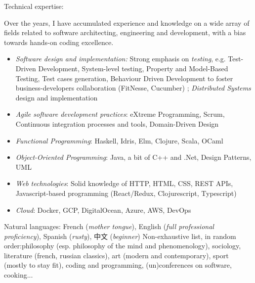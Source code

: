 \documentclass[12pt,a4paper]{article}
\begin{document}




\inlineheadsection
    {Technical expertise:}
    {Over the years, I have accumulated experience and knowledge on a wide array of fields related to software architecting, engineering and development, with a bias towards hands-on coding excellence.
      \begin{itemize}
      \item \emph{Software design and implementation:} Strong emphasis on \emph{testing}, e.g. Test-Driven Development, System-level testing, Property and Model-Based Testing, Test cases generation, Behaviour Driven Development to foster business-developers collaboration (FitNesse, Cucumber) ; \emph{Distributed Systems} design and implementation
      \item \emph{Agile software development practices}: eXtreme Programming, Scrum, Continuous integration processes and tools, Domain-Driven Design
      \item \emph{Functional Programming}: Haskell, Idris, Elm, Clojure, Scala, OCaml
      \item \emph{Object-Oriented Programming}: Java, a bit of C++ and .Net, Design Patterns, UML
      \item \emph{Web technologies}: Solid knowledge of HTTP, HTML, CSS, REST APIs, Javascript-based programming (React/Redux, Clojurescript, Typescript)
      \item \emph{Cloud}: Docker, GCP, DigitalOcean, Azure, AWS, DevOps
      \end{itemize}
    }
    \inlineheadsection
        {Natural languages:}
        {French (\emph{mother tongue}), English (\emph{full professional proficiency}), Spanish (\emph{rusty}), 中文 (\emph{beginner})}
\inlineheadsection
    {Non-exhaustive list, in random order:}{philosophy (esp. philosophy of the mind and phenomenology), sociology, literature (french, russian classics), art (modern and contemporary), sport (mostly to stay fit), coding and programming, (un)conferences on software, cooking...}
\end{document}
